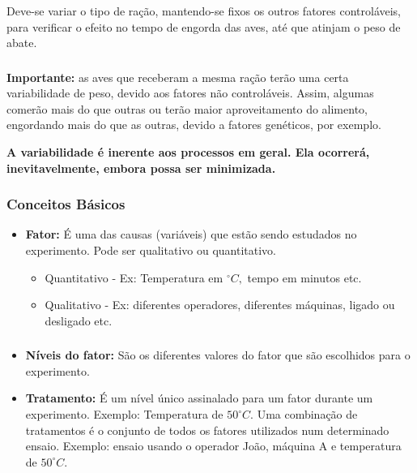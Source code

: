 \documentclass[14pt,aspectratio=1610]{beamer}
\begin{document}
\begin{frame}{}
\frametitle{}
\begin{block}{}
\justifying
Deve-se variar o tipo de ração, mantendo-se fixos os outros fatores controláveis, para
verificar o efeito no tempo de engorda das aves, até que atinjam o peso de abate.
\end{block}
\end{frame}

\begin{frame}{}
\frametitle{}
{\bf Importante:} as aves que receberam a mesma ração terão uma certa variabilidade de peso, devido aos fatores não controláveis. Assim, algumas comerão mais do que outras ou terão maior aproveitamento do alimento, engordando mais do que as outras, devido a
fatores genéticos, por exemplo. \pause

\begin{block}{}
\justifying
{\bf A variabilidade é inerente aos processos em geral. Ela ocorrerá, inevitavelmente,
embora possa ser minimizada.}
\end{block}
\end{frame}

\begin{frame}{}
\frametitle{Conceitos Básicos}
\begin{block}{}
\justifying
\begin{itemize}
\item {\bf Fator:} É uma das causas (variáveis) que estão sendo estudados no experimento. Pode ser qualitativo ou quantitativo.\pause
\begin{itemize}
\item Quantitativo - Ex: Temperatura em $^{\circ}C,$ tempo em minutos etc.\pause
\item Qualitativo - Ex: diferentes operadores, diferentes máquinas, ligado ou desligado etc.
\end{itemize}
\end{itemize}
\end{block}
\end{frame}

\begin{frame}{}
\frametitle{}
\begin{block}{}
\justifying
\begin{itemize}
\item {\bf Níveis do fator:} São os diferentes valores do fator que são escolhidos para o experimento. \pause
\item {\bf Tratamento:} É um nível único assinalado para um fator durante um experimento. Exemplo: Temperatura de $50^{\circ}C$. Uma combinação de tratamentos é o conjunto de todos os fatores utilizados num determinado ensaio. Exemplo: ensaio usando o operador João, máquina A e temperatura de $50^{\circ}C$.
\end{itemize}
\end{block}
\end{frame}
\end{document}
